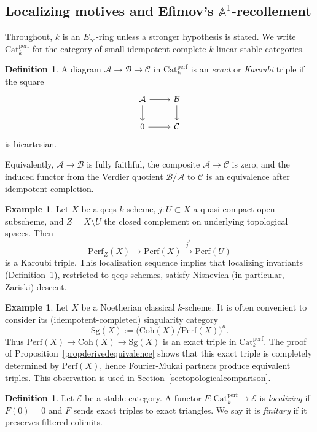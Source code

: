 \documentclass{amsart}
\theoremstyle{plain}
\theoremstyle{definition}
\newtheorem{defi}[prop]{Definition}
\newtheorem{example}[prop]{Example}
\newcommand{\cA}{{\mathcal A}}
\newcommand{\cB}{{\mathcal B}}
\newcommand{\cC}{{\mathcal C}}
\newcommand{\cE}{{\mathcal E}}
\newcommand{\bbA}{\mathbb{A}}
\newcommand{\Catperf}{\mathrm{Cat}^{\mathrm{perf}}}
\newcommand{\Perf}{\mathrm{Perf}}
\newcommand{\Coh}{\mathrm{Coh}}
\newcommand{\Sg}{\mathrm{Sg}}
\begin{document}
\subsection{Localizing motives and Efimov's $\bbA^1$-recollement}

Throughout, $k$ is an $E_\infty$-ring unless a stronger hypothesis is stated.
We write $\Catperf_k$ for the  category of small idempotent-complete
$k$-linear stable  categories.

\begin{defi}
A diagram $\cA\to\cB\to\cC$ in $\Catperf_k$ is an \emph{exact} or
\emph{Karoubi} triple if the square
\[
\begin{tikzcd}
\cA \arrow[r] \arrow[d] & \cB \arrow[d] \\
0 \arrow[r] & \cC
\end{tikzcd}
\]
is bicartesian.
\end{defi}

Equivalently, $\cA\to\cB$ is fully faithful, the composite
$\cA\to\cC$ is zero, and the induced functor from the Verdier quotient
$\cB/\cA$ to $\cC$ is an equivalence after idempotent completion.


\begin{example}\label{Nisnevich}\label{exlocalization}
Let $X$ be a qcqs $k$-scheme, $j\colon U\subset X$ a quasi-compact open subscheme, and $Z=X\setminus U$ the closed complement on underlying topological spaces.  Then
\[
\Perf_Z(X)\longrightarrow\Perf(X)\xrightarrow{j^*}\Perf(U)
\]
is a Karoubi triple. This localization sequence implies that localizing invariants (Definition~\ref{locdefi}), restricted to qcqs schemes, satisfy Nisnevich (in particular, Zariski) descent.
\end{example}

\begin{example}\label{Sgcategory}
Let $X$ be a Noetherian classical $k$-scheme.
It is often convenient to consider its (idempotent-completed) singularity category
\[
\Sg(X)
 :=\bigl(\Coh(X)/\Perf(X)\bigr)^{\kappa}.
\]
Thus $\Perf(X)\to \Coh(X)\to \Sg(X)$ is an exact triple in $\Catperf_k$. The proof of Proposition~\ref{propderivedequivalence} shows that this exact triple is completely determined by $\Perf(X)$, hence Fourier-Mukai partners produce equivalent triples. This observation is used in Section~\ref{sectopologicalcomparison}.
\end{example}

\begin{defi}\label{locdefi}
Let $\cE$ be a stable  category.  A functor
$F\colon\Catperf_k\to\cE$ is
\emph{localizing} if $F(0)=0$ and $F$ sends exact triples to exact triangles.  We say it is  \emph{finitary} if it preserves filtered colimits.
\end{defi}
\end{document}
